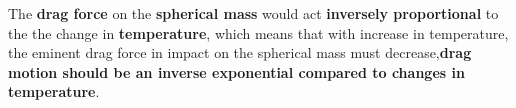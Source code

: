 
{The \textbf{drag force} on the \textbf{spherical mass} would act \textbf{inversely proportional} to the the change in \textbf{temperature}, which means that with increase in temperature, the eminent drag force in impact on the spherical mass must decrease,\textbf{drag motion should be an inverse exponential compared to changes in temperature}.}


